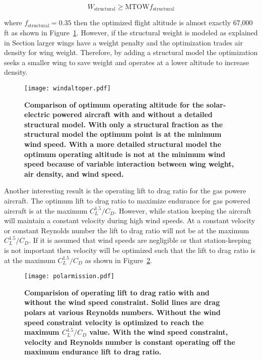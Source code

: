 \documentclass[]{aiaa-tc}%
\begin{document}
\begin{equation}
    W_{\text{structural}} \geq \text{MTOW} f_{\text{structural}}
\end{equation}

where $f_{\text{structural}} = 0.35$ then the optimized flight altitude is almost exactly 67,000 ft as shown in Figure~\ref{f:altoper}.  
However, if the structural weight is modeled as explained in Section larger wings have a weight penalty and the optimization trades air density for wing weight.
Therefore, by adding a structural model the optimization seeks a smaller wing to save weight and operates at a lower altitude to increase density. 

\begin{figure}[H]
	\begin{center}
	\texttt{[image: windaltoper.pdf]}
 \caption{\textbf{Comparison of optimum operating altitude for the solar-electric powered aircraft with and without a detailed structural model.  With only a structural fraction as the structural model the optimum point is at the minimum wind speed.  With a more detailed structural model the optimum operating altitude is not at the minimum wind speed because of variable interaction between wing weight, air density, and wind speed.}}
 \label{f:altoper}
	\end{center}
\end{figure}

Another interesting result is the operating lift to drag ratio for the gas powere aircraft.  
The optimum lift to drag ratio to maximize endurance for gas powered aircraft is at the maximum $C_L^{1.5}/C_D$.\cite{br2}  
However, while station keeping the aircraft will maintain a constant velocity during high wind speeds.  
At a constant velocity or constant Reynolds number the lift to drag ratio will not be at the maximum $C_L^{1.5}/C_D$.  
If it is assumed that wind speeds are negligible or that station-keeping is not important then velocity will be optimized such that the lift to drag ratio is at the maximum $C_L^{1.5}/C_D$ as shown in Figure~\ref{f:polarmission}.

\begin{figure}[H]
	\begin{center}
	\texttt{[image: polarmission.pdf]}
    \caption{\textbf{Comparision of operating lift to drag ratio with and without the wind speed constraint. Solid lines are drag polars at various Reynolds numbers. Without the wind speed constraint velocity is optimized to reach the maximum $C_L^{1.5}/C_D$ value.  With the wind speed constraint, velocity and Reynolds number is constant operating off the maximum endurance lift to drag ratio.}}
 \label{f:polarmission}
	\end{center}
\end{figure}
\end{document}
